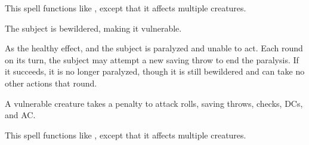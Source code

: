 \begin{spelleffect}
  This spell functions like , except that it affects multiple creatures.
\end{spelleffect}

\spellrng{\rngclose}
\begin{spellhealthy}
  The subject is bewildered, making it vulnerable.
\end{spellhealthy}
\begin{spellblood}
  As the healthy effect, and the subject is paralyzed and unable to act. Each round on its turn, the subject may attempt a new saving throw to end the paralysis. If it succeeds, it is no longer paralyzed, though it is still bewildered and can take no other actions that round.
\end{spellblood}
\begin{spellnotes}
  A vulnerable creature takes a  penalty to attack rolls, saving throws, checks, DCs, and AC.
\end{spellnotes}

\spellrng{\rngmed}
\begin{spelleffect}
  This spell functions like , except that it affects multiple creatures.
\end{spelleffect}

